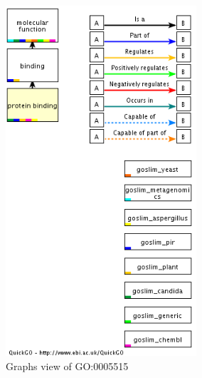 \begin{figure}[htbp]
	\centering
	\includegraphics[height=13cm]{analisis/visualize.png}
	\caption{Graphs view of GO:0005515}
	\label{pic:gv-go}
\end{figure}

